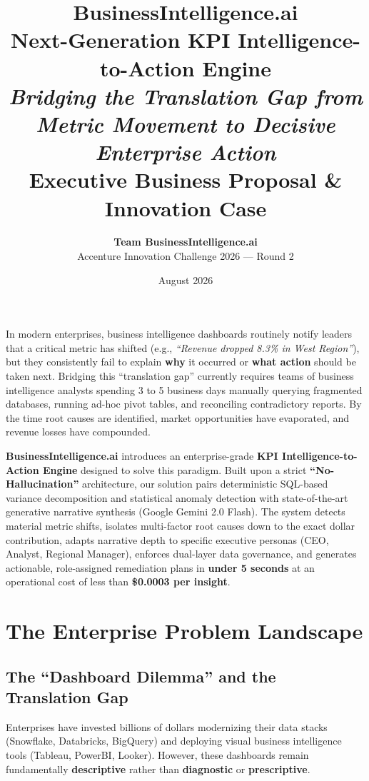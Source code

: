 \documentclass[11pt,a4paper]{article}
\title{
    \vspace{-1.5em}
    \textcolor{accenturepurple}{\textbf{\Huge BusinessIntelligence.ai}}\\[0.4em]
    \LARGE \textbf{Next-Generation KPI Intelligence-to-Action Engine}\\[0.6em]
    \large \textit{Bridging the Translation Gap from Metric Movement to Decisive Enterprise Action}\\[1em]
    \normalsize \textbf{Executive Business Proposal \& Innovation Case}
}
\author{
    \textbf{Team BusinessIntelligence.ai} \\
    Accenture Innovation Challenge 2026 — Round 2
}
\date{August 2026}
\begin{document}
\maketitle

\begin{tcolorbox}[colback=codebg,colframe=accenturepurple,title=\textbf{Executive Summary}]
In modern enterprises, business intelligence dashboards routinely notify leaders that a critical metric has shifted (e.g., \textit{``Revenue dropped 8.3\% in West Region''}), but they consistently fail to explain \textbf{why} it occurred or \textbf{what action} should be taken next. Bridging this ``translation gap'' currently requires teams of business intelligence analysts spending 3 to 5 business days manually querying fragmented databases, running ad-hoc pivot tables, and reconciling contradictory reports. By the time root causes are identified, market opportunities have evaporated, and revenue losses have compounded.

\textbf{BusinessIntelligence.ai} introduces an enterprise-grade \textbf{KPI Intelligence-to-Action Engine} designed to solve this paradigm. Built upon a strict \textbf{``No-Hallucination''} architecture, our solution pairs deterministic SQL-based variance decomposition and statistical anomaly detection with state-of-the-art generative narrative synthesis (Google Gemini 2.0 Flash). The system detects material metric shifts, isolates multi-factor root causes down to the exact dollar contribution, adapts narrative depth to specific executive personas (CEO, Analyst, Regional Manager), enforces dual-layer data governance, and generates actionable, role-assigned remediation plans in \textbf{under 5 seconds} at an operational cost of less than \textbf{\$0.0003 per insight}.
\end{tcolorbox}

\tableofcontents
\newpage

\section{The Enterprise Problem Landscape}

\subsection{The ``Dashboard Dilemma'' and the Translation Gap}
Enterprises have invested billions of dollars modernizing their data stacks (Snowflake, Databricks, BigQuery) and deploying visual business intelligence tools (Tableau, PowerBI, Looker). However, these dashboards remain fundamentally \textbf{descriptive} rather than \textbf{diagnostic} or \textbf{prescriptive}.
\end{document}
